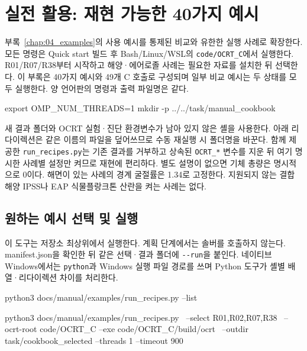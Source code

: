 
\chapter{실전 활용: 재현 가능한 40가지 예시}

\label{chap:09_cookbook}

부록~\ref{chap:04_examples}의 사용 예시를 통제된 비교와 유한한 실행 사례로 확장한다. 모든 명령은 Quick start 빌드 후 Bash/Linux/WSL의 \texttt{code/\allowbreak{}OCRT\_\allowbreak{}C}에서 실행한다. R01/R07/R38부터 시작하고 해양·에어로졸 사례는 필요한 자료를 설치한 뒤 선택한다. 이 부록은 40가지 예시와 49개 C 호출로 구성되며 일부 비교 예시는 두 상태를 모두 실행한다. 양 언어판의 명령과 출력 파일명은 같다.

\noindent\begin{minipage}{\linewidth}
\begin{ManualCode}

export OMP_NUM_THREADS=1
mkdir -p ../../task/manual_cookbook

\end{ManualCode}
\end{minipage}\par

새 결과 폴더와 OCRT 실험·진단 환경변수가 남아 있지 않은 셸을 사용한다. 아래 리다이렉션은 같은 이름의 파일을 덮어쓰므로 수동 재실행 시 폴더명을 바꾼다. 함께 제공한 \texttt{run\_\allowbreak{}recipes.py}는 기존 결과를 거부하고 상속된 \texttt{OCRT\_\allowbreak{}*} 변수를 지운 뒤 여기 명시한 사례별 설정만 켜므로 재현에 편리하다. 별도 설명이 없으면 기체 총량은 명시적으로 0이다. 해면이 있는 사례의 경계 굴절률은 1.34로 고정한다. 지원되지 않는 결합 해양 IPSS나 EAP 식물플랑크톤 산란을 켜는 사례는 없다.

\section{원하는 예시 선택 및 실행}
\label{sec:auto:09_cookbook:1}

이 도구는 저장소 최상위에서 실행한다. 계획 단계에서는 솔버를 호출하지 않는다. manifest.json을 확인한 뒤 같은 선택·결과 폴더에 \texttt{-\allowbreak{}-\allowbreak{}run}을 붙인다. 네이티브 Windows에서는 \texttt{python}과 Windows 실행 파일 경로를 쓰며 Python 도구가 셸별 배열·리다이렉션 차이를 처리한다.

\noindent\begin{minipage}{\linewidth}
\begin{ManualCode}

python3 docs/manual/examples/run_recipes.py --list

python3 docs/manual/examples/run_recipes.py \
  --select R01,R02,R07,R38 \
  --ocrt-root code/OCRT_C --exe code/OCRT_C/build/ocrt \
  --outdir task/cookbook_selected --threads 1 --timeout 900

\end{ManualCode}
\end{minipage}\par

